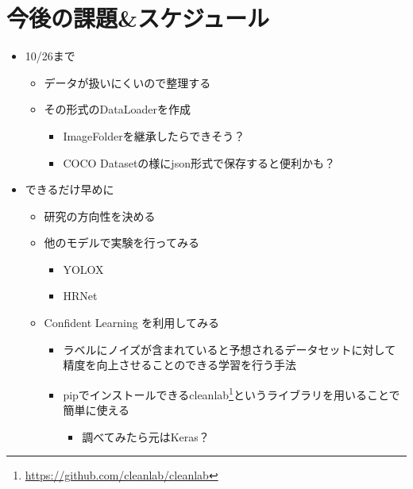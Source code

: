 \documentclass[a4j]{ujarticle}
\begin{document}
    \section{今後の課題\&スケジュール}
		\begin{itemize}
			\item 10/26まで
			\begin{itemize}
                \item データが扱いにくいので整理する
                \item その形式のDataLoaderを作成
                \begin{itemize}
                    \item ImageFolderを継承したらできそう？
                    \item COCO Datasetの様にjson形式で保存すると便利かも？
                \end{itemize}
            \end{itemize}
			\item できるだけ早めに
			\begin{itemize}
                \item 研究の方向性を決める
                \item 他のモデルで実験を行ってみる
                \begin{itemize}
                    \item YOLOX
                    \item HRNet
                \end{itemize}
                \item Confident Learning \cite{cleanlab} を利用してみる
                \begin{itemize}
                    \item ラベルにノイズが含まれていると予想されるデータセットに対して精度を向上させることのできる学習を行う手法
                    \item pipでインストールできるcleanlab\footnote{\url{https://github.com/cleanlab/cleanlab}}というライブラリを用いることで簡単に使える
                    \begin{itemize}
                        \item 調べてみたら元はKeras？
                    \end{itemize}
                \end{itemize}
            \end{itemize}
		\end{itemize}
\end{document}
